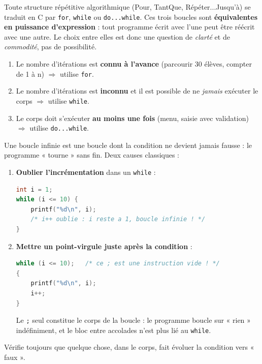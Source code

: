 \documentclass[11pt]{article}
\newcommand{\cle}[1]{{\popxbold\color{popdark}#1}}
\begin{document}
\begin{propriete}
Toute structure répétitive algorithmique (\cle{Pour}, \cle{TantQue}, \cle{Répéter...Jusqu'à}) se traduit en C par \texttt{for}, \texttt{while} ou \texttt{do...while}. Ces trois boucles sont \textbf{équivalentes en puissance d'expression} : tout programme écrit avec l'une peut être réécrit avec une autre. Le choix entre elles est donc une question de \emph{clarté} et de \emph{commodité}, pas de possibilité.
\end{propriete}

\begin{methode}
\begin{enumerate}
\item Le nombre d'itérations est \textbf{connu à l'avance} (parcourir 30 élèves, compter de 1 à n) $\Rightarrow$ utilise \texttt{for}.
\item Le nombre d'itérations est \textbf{inconnu} et il est possible de ne \emph{jamais} exécuter le corps $\Rightarrow$ utilise \texttt{while}.
\item Le corps doit s'exécuter \textbf{au moins une fois} (menu, saisie avec validation) $\Rightarrow$ utilise \texttt{do...while}.
\end{enumerate}
\end{methode}

\begin{attention}
Une \cle{boucle infinie} est une boucle dont la condition ne devient jamais fausse : le programme « tourne » sans fin. Deux causes classiques :
\begin{enumerate}
\item \textbf{Oublier l'incrémentation} dans un \texttt{while} :
\begin{lstlisting}[language=C]
int i = 1;
while (i <= 10) {
    printf("%d\n", i);
    /* i++ oublie : i reste a 1, boucle infinie ! */
}
\end{lstlisting}
\item \textbf{Mettre un point-virgule juste après la condition} :
\begin{lstlisting}[language=C]
while (i <= 10);   /* ce ; est une instruction vide ! */
{
    printf("%d\n", i);
    i++;
}
\end{lstlisting}
Le \texttt{;} seul constitue le corps de la boucle : le programme boucle sur « rien » indéfiniment, et le bloc entre accolades n'est plus lié au \texttt{while}.
\end{enumerate}
Vérifie toujours que quelque chose, dans le corps, fait évoluer la condition vers « faux ».
\end{attention}
\end{document}
